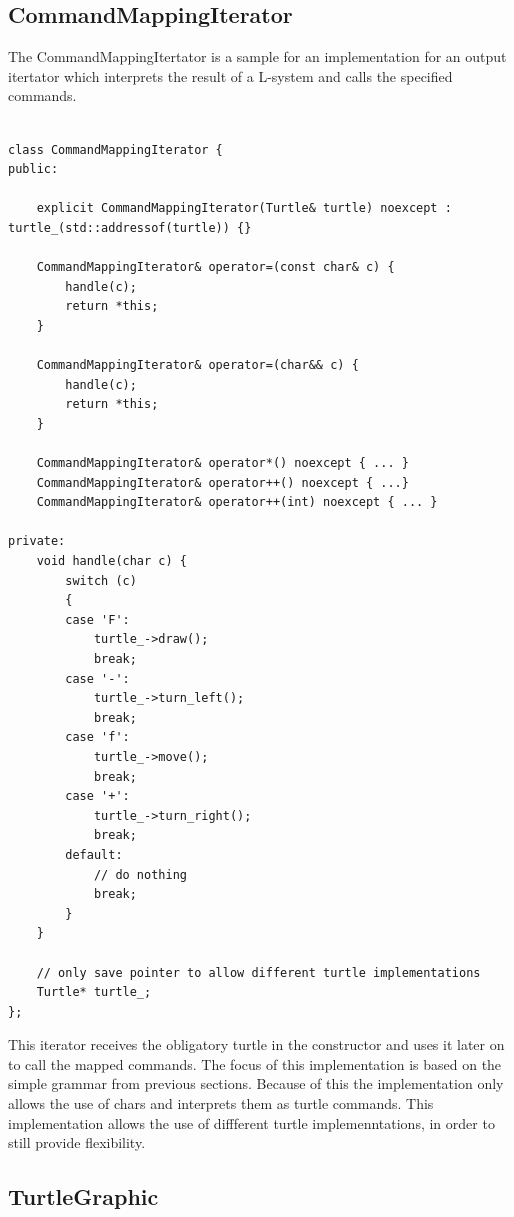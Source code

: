 \documentclass[english]{cpp-hmwk}
\begin{document}
\subsection{CommandMappingIterator}

The CommandMappingItertator is a sample for an implementation for an output itertator which interprets the result of a L-system and calls the specified commands. 

\medskip
\begin{lstlisting}

class CommandMappingIterator {
public:

    explicit CommandMappingIterator(Turtle& turtle) noexcept : turtle_(std::addressof(turtle)) {}

    CommandMappingIterator& operator=(const char& c) {
        handle(c);
        return *this;
    }

    CommandMappingIterator& operator=(char&& c) {
        handle(c);
        return *this;
    }

    CommandMappingIterator& operator*() noexcept { ... }
    CommandMappingIterator& operator++() noexcept { ...}
    CommandMappingIterator& operator++(int) noexcept { ... }

private:
    void handle(char c) {
        switch (c)
        {
        case 'F':
            turtle_->draw();
            break;
        case '-':
            turtle_->turn_left();
            break;
        case 'f':
            turtle_->move();
            break;
        case '+':
            turtle_->turn_right();
            break;
        default:
            // do nothing
            break;
        }
    }

    // only save pointer to allow different turtle implementations
    Turtle* turtle_;
};

\end{lstlisting}

\noindent This iterator receives the obligatory turtle in the constructor and uses it later on to call the mapped commands. The focus of this implementation is based on the simple grammar from previous sections. Because of this the implementation only allows the use of chars and interprets them as turtle commands. This implementation allows the use of diffferent turtle implemenntations, in order to still provide flexibility.

\subsection{TurtleGraphic}
\end{document}
